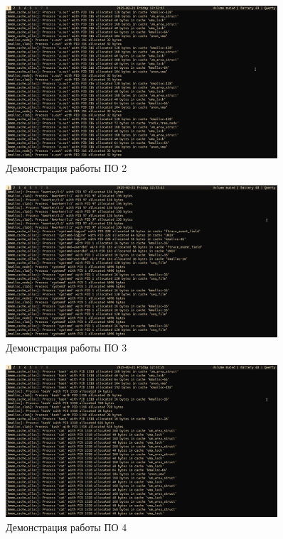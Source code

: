 \begin{figure}[H]
	\centering
	\includegraphics[width=0.9\textwidth]{img/out2.png}
	\caption{Демонстрация работы ПО 2}
	\label{fig:out2}
\end{figure}

\begin{figure}[H]
	\centering
	\includegraphics[width=0.9\textwidth]{img/out3.png}
	\caption{Демонстрация работы ПО 3}
	\label{fig:out3}
\end{figure}

\begin{figure}[H]
	\centering
	\includegraphics[width=0.9\textwidth]{img/out4.png}
	\caption{Демонстрация работы ПО 4}
	\label{fig:out4}
\end{figure}

